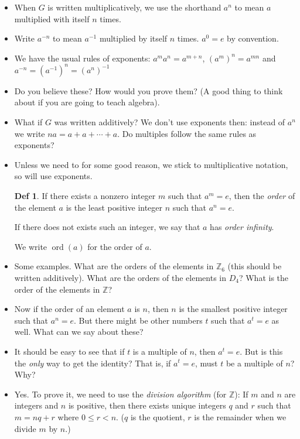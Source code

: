 \documentclass[12pt]{article}
\theoremstyle{plain}
\theoremstyle{definition}
\newtheorem*{definition}{Def}
\theoremstyle{remark}
\def\Z{\mathbb Z}
\def\inv{^{-1}}
\DeclareMathOperator{\ord}{ord}
\begin{document}
\begin{itemize}
 \item When $G$ is written multiplicatively, we use the shorthand $a^n$ to mean $a$ multiplied with itself $n$ times.  
 \item Write $a^{-n}$ to mean $a\inv$ multiplied by itself $n$ times.  $a^0 = e$ by convention.
 \item We have the usual rules of exponents: $a^ma^n = a^{m+n}$, $(a^m)^n = a^{mn}$ and $a^{-n} = (a\inv)^n = (a^n)\inv$
 \item Do you believe these?  How would you prove them?  (A good thing to think about if you are going to teach algebra).
 \item What if $G$ was written additively?  We don't use exponents then: instead of $a^n$ we write $na = a+a+\cdots + a$.  Do multiples follow the same rules as exponents?
 \item Unless we need to for some good reason, we stick to multiplicative notation, so will use exponents.
 \begin{definition}
  If there exists a nonzero integer $m$ such that $a^m = e$, then the {\em order} of the element $a$ is the least positive integer $n$ such that $a^n = e$.

  If there does not exists such an integer, we say that $a$ has {\em order infinity}.

  We write $\ord(a)$ for the order of $a$.
 \end{definition}

 \item Some examples.  What are the orders of the elements in $\Z_6$ (this should be written additively). What are the orders of the elements in $D_4$? What is the order of the elements in $\Z$?

 \item Now if the order of an element $a$ is $n$, then $n$ is the smallest positive integer such that $a^n = e$.  But there might be other numbers $t$ such that $a^t = e$ as well.  What can we say about these?

 \item It should be easy to see that if $t$ is a multiple of $n$, then $a^t = e$.  But is this the {\em only} way to get the identity?  That is, if $a^t = e$, must $t$ be a multiple of $n$? Why?

 \item Yes.  To prove it, we need to use the {\em division algorithm} (for $\Z$): If $m$ and $n$ are integers and $n$ is positive, then there exists unique integers $q$ and $r$ such that $m = nq + r$ where $0 \le r < n$.  ($q$ is the quotient, $r$ is the remainder when we divide $m$ by $n$.)


\end{itemize}
\end{document}
